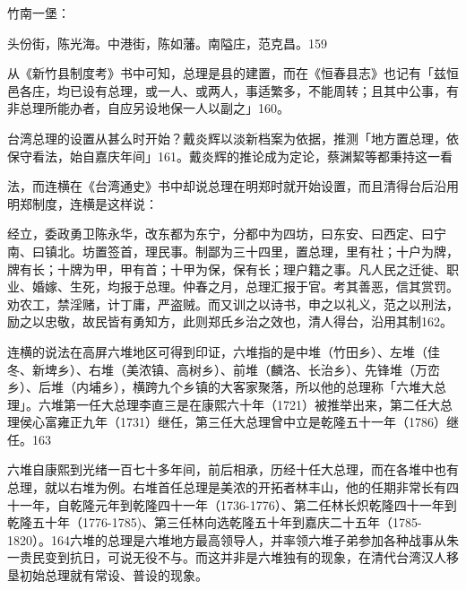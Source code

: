 竹南一堡：

\begin{BookQuote}
头份街，陈光海。中港街，陈如藩。南隘庄，范克昌。159
\end{BookQuote}

从《新竹县制度考》书中可知，总理是县的建置，而在《恒春县志》也记有「兹恒邑各庄，均已设有总理，或一人、或两人，事适繁多，不能周转；且其中公事，有非总理所能办者，自应另设地保一人以副之」160。

台湾总理的设置从甚么时开始？戴炎辉以淡新档案为依据，推测「地方置总理，依保守看法，始自嘉庆年间」161。戴炎辉的推论成为定论，蔡渊絜等都秉持这一看

\vfill
\begin{BookNotes}
\end{BookNotes}

\noindent 法，而连横在《台湾通史》书中却说总理在明郑时就开始设置，而且清得台后沿用明郑制度，连横是这样说：

\begin{BookQuote}
经立，委政勇卫陈永华，改东都为东宁，分都中为四坊，曰东安、曰西定、曰宁南、曰镇北。坊置签首，理民事。制鄙为三十四里，置总理，里有社；十户为牌，牌有长；十牌为甲，甲有首；十甲为保，保有长；理户籍之事。凡人民之迁徙、职业、婚嫁、生死，均报于总理。仲春之月，总理汇报于官。考其善恶，信其赏罚。劝农工，禁淫赌，计丁庸，严盗贼。而又训之以诗书，申之以礼义，范之以刑法，励之以忠敬，故民皆有勇知方，此则郑氏乡治之效也，清人得台，沿用其制162。
\end{BookQuote}

连横的说法在高屏六堆地区可得到印证，六堆指的是中堆（竹田乡）、左堆（佳冬、新埤乡）、右堆（美浓镇、高树乡）、前堆（麟洛、长治乡）、先锋堆（万峦乡）、后堆（内埔乡），横跨九个乡镇的大客家聚落，所以他的总理称「六堆大总理」。六堆第一任大总理李直三是在康熙六十年（1721）被推举出来，第二任大总理侯心富雍正九年（1731）继任，第三任大总理曾中立是乾隆五十一年（1786）继任。163

六堆自康熙到光绪一百七十多年间，前后相承，历经十任大总理，而在各堆中也有总理，就以右堆为例。右堆首任总理是美浓的开拓者林丰山，他的任期非常长有四十一年，自乾隆元年到乾隆四十一年（1736-1776）、第二任林长炽乾隆四十一年到乾隆五十年（1776-1785)、第三任林向选乾隆五十年到嘉庆二十五年（1785-1820）。164六堆的总理是六堆地方最高领导人，并率领六堆子弟参加各种战事从朱一贵民变到抗日，可说无役不与。而这并非是六堆独有的现象，在清代台湾汉人移垦初始总理就有常设、普设的现象。

